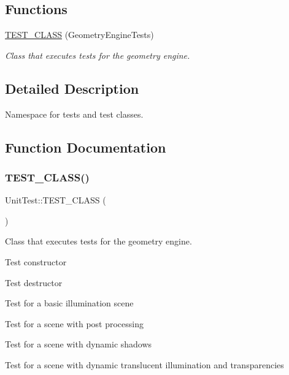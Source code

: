 \subsection*{Functions}
\begin{DoxyCompactItemize}
\item 
\mbox{\hyperlink{namespace_unit_test_aa27c1a34f019a757474599d420492bf6}{T\+E\+S\+T\+\_\+\+C\+L\+A\+SS}} (Geometry\+Engine\+Tests)
\begin{DoxyCompactList}\small\item\em Class that executes tests for the geometry engine. \end{DoxyCompactList}\end{DoxyCompactItemize}


\subsection{Detailed Description}
Namespace for tests and test classes. 

\subsection{Function Documentation}
\mbox{\label{namespace_unit_test_aa27c1a34f019a757474599d420492bf6}} 
\subsubsection{\texorpdfstring{TEST\_CLASS()}{TEST\_CLASS()}}
{\footnotesize\ttfamily Unit\+Test\+::\+T\+E\+S\+T\+\_\+\+C\+L\+A\+SS (\begin{DoxyParamCaption}\item[{Geometry\+Engine\+Tests}]{ }\end{DoxyParamCaption})}



Class that executes tests for the geometry engine. 

Test constructor

Test destructor

Test for a basic illumination scene

Test for a scene with post processing

Test for a scene with dynamic shadows

Test for a scene with dynamic translucent illumination and transparencies 